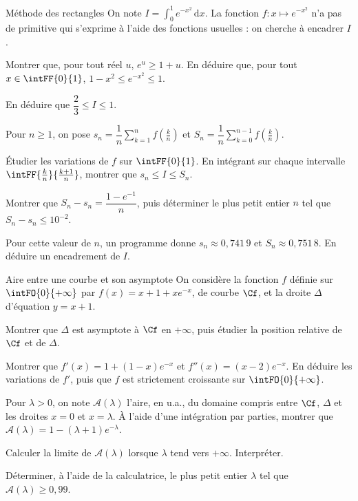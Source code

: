 \begin{exercice}[3]{Méthode des rectangles}
On note $I=\displaystyle\int_0^1e^{-x^{2}}\,\mathrm{d}x$. La fonction $f:x\mapsto e^{-x^{2}}$ n'a pas de primitive qui s'exprime à
l'aide des fonctions usuelles : on cherche à encadrer $I$.
\begin{questions}
  \item Montrer que, pour tout réel $u$, $e^{u}\geq1+u$. En déduire que, pour tout $x\in\intFF{0}{1}$, $1-x^{2}\leq e^{-x^{2}}\leq1$.
  \item En déduire que $\dfrac23\leq I\leq1$.
\end{questions}
Pour $n\geq1$, on pose $s_n=\dfrac1n\displaystyle\sum_{k=1}^{n}f\left(\frac kn\right)$ et $S_n=\dfrac1n\displaystyle\sum_{k=0}^{n-1}f\left(\frac kn\right)$.
\begin{questions}[resume]
  \item Étudier les variations de $f$ sur $\intFF{0}{1}$. En intégrant sur chaque intervalle $\intFF{\frac kn}{\frac{k+1}{n}}$,
    montrer que $s_n\leq I\leq S_n$.
  \item Montrer que $S_n-s_n=\dfrac{1-e^{-1}}{n}$, puis déterminer le plus petit entier $n$ tel que $S_n-s_n\leq10^{-2}$.
  \item Pour cette valeur de $n$, un programme donne $s_n\approx0{,}741\,9$ et $S_n\approx0{,}751\,8$. En déduire un encadrement de $I$.
\end{questions}
\end{exercice}

\begin{exercice}[3]{Aire entre une courbe et son asymptote}
On considère la fonction $f$ définie sur $\intFO{0}{+\infty}$ par $f(x)=x+1+xe^{-x}$, de courbe $\Cf$, et la droite $\Delta$
d'équation $y=x+1$.
\begin{questions}
  \item Montrer que $\Delta$ est asymptote à $\Cf$ en $+\infty$, puis étudier la position relative de $\Cf$ et de $\Delta$.
  \item Montrer que $f'(x)=1+(1-x)e^{-x}$ et $f''(x)=(x-2)e^{-x}$. En déduire les variations de $f'$, puis que $f$ est
    strictement croissante sur $\intFO{0}{+\infty}$.
  \item Pour $\lambda>0$, on note $\mathcal{A}(\lambda)$ l'aire, en u.a., du domaine compris entre $\Cf$, $\Delta$ et les droites
    $x=0$ et $x=\lambda$. À l'aide d'une intégration par parties, montrer que $\mathcal{A}(\lambda)=1-(\lambda+1)e^{-\lambda}$.
  \item Calculer la limite de $\mathcal{A}(\lambda)$ lorsque $\lambda$ tend vers $+\infty$. Interpréter.
  \item Déterminer, à l'aide de la calculatrice, le plus petit entier $\lambda$ tel que $\mathcal{A}(\lambda)\geq0{,}99$.
\end{questions}
\end{exercice}
